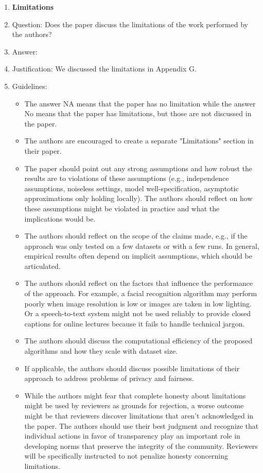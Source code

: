 \documentclass{article}
\begin{document}
\begin{enumerate}
\item {\bf Limitations}
    \item[] Question: Does the paper discuss the limitations of the work performed by the authors?
    \item[] Answer: \answerYes{} %
    \item[] Justification: We discussed the limitations in Appendix G.
    \item[] Guidelines:
    \begin{itemize}
        \item The answer NA means that the paper has no limitation while the answer No means that the paper has limitations, but those are not discussed in the paper. 
        \item The authors are encouraged to create a separate "Limitations" section in their paper.
        \item The paper should point out any strong assumptions and how robust the results are to violations of these assumptions (e.g., independence assumptions, noiseless settings, model well-specification, asymptotic approximations only holding locally). The authors should reflect on how these assumptions might be violated in practice and what the implications would be.
        \item The authors should reflect on the scope of the claims made, e.g., if the approach was only tested on a few datasets or with a few runs. In general, empirical results often depend on implicit assumptions, which should be articulated.
        \item The authors should reflect on the factors that influence the performance of the approach. For example, a facial recognition algorithm may perform poorly when image resolution is low or images are taken in low lighting. Or a speech-to-text system might not be used reliably to provide closed captions for online lectures because it fails to handle technical jargon.
        \item The authors should discuss the computational efficiency of the proposed algorithms and how they scale with dataset size.
        \item If applicable, the authors should discuss possible limitations of their approach to address problems of privacy and fairness.
        \item While the authors might fear that complete honesty about limitations might be used by reviewers as grounds for rejection, a worse outcome might be that reviewers discover limitations that aren't acknowledged in the paper. The authors should use their best judgment and recognize that individual actions in favor of transparency play an important role in developing norms that preserve the integrity of the community. Reviewers will be specifically instructed to not penalize honesty concerning limitations.
    \end{itemize}


\end{enumerate}
\end{document}
